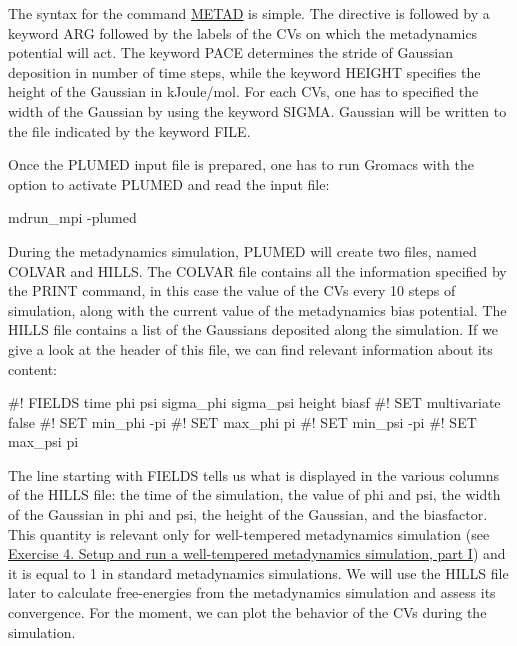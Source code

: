The syntax for the command \hyperlink{METAD}{M\+E\+T\+A\+D} is simple. The directive is followed by a keyword A\+R\+G followed by the labels of the C\+Vs on which the metadynamics potential will act. The keyword P\+A\+C\+E determines the stride of Gaussian deposition in number of time steps, while the keyword H\+E\+I\+G\+H\+T specifies the height of the Gaussian in k\+Joule/mol. For each C\+Vs, one has to specified the width of the Gaussian by using the keyword S\+I\+G\+M\+A. Gaussian will be written to the file indicated by the keyword F\+I\+L\+E.

Once the P\+L\+U\+M\+E\+D input file is prepared, one has to run Gromacs with the option to activate P\+L\+U\+M\+E\+D and read the input file\+:

\begin{DoxyVerb}mdrun_mpi -plumed
\end{DoxyVerb}


During the metadynamics simulation, P\+L\+U\+M\+E\+D will create two files, named C\+O\+L\+V\+A\+R and H\+I\+L\+L\+S. The C\+O\+L\+V\+A\+R file contains all the information specified by the P\+R\+I\+N\+T command, in this case the value of the C\+Vs every 10 steps of simulation, along with the current value of the metadynamics bias potential. The H\+I\+L\+L\+S file contains a list of the Gaussians deposited along the simulation. If we give a look at the header of this file, we can find relevant information about its content\+:

\begin{DoxyVerb}#! FIELDS time phi psi sigma_phi sigma_psi height biasf
#! SET multivariate false
#! SET min_phi -pi
#! SET max_phi pi
#! SET min_psi -pi
#! SET max_psi pi
\end{DoxyVerb}


The line starting with F\+I\+E\+L\+D\+S tells us what is displayed in the various columns of the H\+I\+L\+L\+S file\+: the time of the simulation, the value of phi and psi, the width of the Gaussian in phi and psi, the height of the Gaussian, and the biasfactor. This quantity is relevant only for well-\/tempered metadynamics simulation (see \hyperlink{belfast-6_belfast-6-exercise-4}{Exercise 4. Setup and run a well-\/tempered metadynamics simulation, part I}) and it is equal to 1 in standard metadynamics simulations. We will use the H\+I\+L\+L\+S file later to calculate free-\/energies from the metadynamics simulation and assess its convergence. For the moment, we can plot the behavior of the C\+Vs during the simulation.

